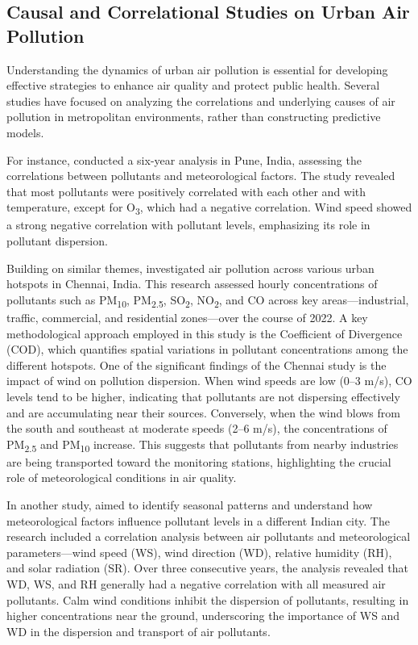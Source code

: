 \documentclass[twoside,11pt]{article}
\begin{document}
\subsection{Causal and Correlational Studies on Urban Air Pollution}

Understanding the dynamics of urban air pollution is essential for developing effective strategies to enhance air quality and protect public health. Several studies have focused on analyzing the correlations and underlying causes of air pollution in metropolitan environments, rather than constructing predictive models.

For instance, \citep{refId0} conducted a six-year analysis in Pune, India, assessing the correlations between pollutants and meteorological factors. The study revealed that most pollutants were positively correlated with each other and with temperature, except for O\textsubscript{3}, which had a negative correlation. Wind speed showed a strong negative correlation with pollutant levels, emphasizing its role in pollutant dispersion.

Building on similar themes, \citep{M2024AirQuality} investigated air pollution across various urban hotspots in Chennai, India. This research assessed hourly concentrations of pollutants such as PM\textsubscript{10}, PM\textsubscript{2.5}, SO\textsubscript{2}, NO\textsubscript{2}, and CO across key areas—industrial, traffic, commercial, and residential zones—over the course of 2022. A key methodological approach employed in this study is the Coefficient of Divergence (COD), which quantifies spatial variations in pollutant concentrations among the different hotspots. One of the significant findings of the Chennai study is the impact of wind on pollution dispersion. When wind speeds are low (0–3 m/s), CO levels tend to be higher, indicating that pollutants are not dispersing effectively and are accumulating near their sources. Conversely, when the wind blows from the south and southeast at moderate speeds (2–6 m/s), the concentrations of PM\textsubscript{2.5} and PM\textsubscript{10} increase. This suggests that pollutants from nearby industries are being transported toward the monitoring stations, highlighting the crucial role of meteorological conditions in air quality.

In another study, \citep{Suthar2024Annual} aimed to identify seasonal patterns and understand how meteorological factors influence pollutant levels in a different Indian city. The research included a correlation analysis between air pollutants and meteorological parameters—wind speed (WS), wind direction (WD), relative humidity (RH), and solar radiation (SR). Over three consecutive years, the analysis revealed that WD, WS, and RH generally had a negative correlation with all measured air pollutants. Calm wind conditions inhibit the dispersion of pollutants, resulting in higher concentrations near the ground, underscoring the importance of WS and WD in the dispersion and transport of air pollutants.
\end{document}
